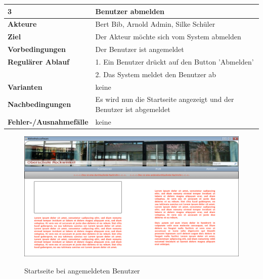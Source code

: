 \documentclass[fontsize=12pt,paper=a4,twoside]{scrartcl}
\begin{document}
\begin{table}[htbp]
\label{3}
\begin{tabular}{|l|p{10cm}|}
\hline 
\textbf{3} & \textbf{Benutzer abmelden} \\ \hline
\textbf{Akteure} & Bert Bib, Arnold Admin, Silke Schüler \\ \hline
\textbf{Ziel} & Der Akteur möchte sich vom System abmelden  \\ \hline
\textbf{Vorbedingungen} & Der Benutzer ist angemeldet  \\ \hline
\textbf{Regulärer Ablauf} & 
1. Ein Benutzer drückt auf den Button 'Abmelden' \\
&2. Das System meldet den Benutzer ab\\
\hline
\textbf{Varianten} & 
keine \\ \hline
\textbf{Nachbedingungen} & Es wird nun die Startseite angezeigt und der Benutzer ist abgemeldet\\
\hline
\textbf{Fehler-/Ausnahmefälle} & keine
\end{tabular}
\end{table}

\begin{figure}[htbp]
\caption{Startseite bei angemeldeten Benutzer}
\includegraphics[width=1\textwidth]{ScreensWebsite/StartseiteLoggedInSchueler.png}
  \label{startlog}
\end{figure}
\end{document}
